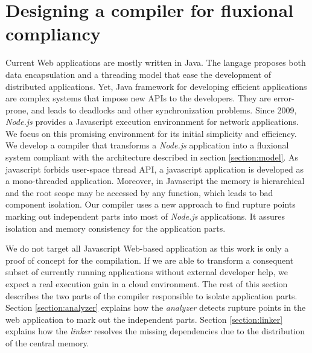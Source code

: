 \section{Designing a compiler for fluxional compliancy} \label{section:compiler}

Current Web applications are mostly written in Java. The langage proposes both data encapsulation and a threading model that ease the development of distributed applications.
Yet, Java framework for developing efficient applications are complex systems that impose new APIs\cite{Coward2003} to the developers.
They are error-prone, and leads to deadlocks and other synchronization problems.
Since 2009, \textit{Node.js}\cite{Dahl} provides a Javascript execution environnment for network applications.
We focus on this promising environment for its initial simplicity and efficiency.
We develop a compiler that transforms a \textit{Node.js} application into a fluxional system compliant with the architecture described in section \ref{section:model}.
As javascript forbids user-space thread API, a javascript application is developed as a mono-threaded application.
Moreover, in Javascript  the memory is hierarchical and the root scope may be accessed by any function, which leads to bad component isolation.
Our compiler uses a new approach to find rupture points marking out independent parts into most of \textit{Node.js} applications.
It assures isolation and memory consistency for the application parts.

We do not target all Javascript Web-based application as this work is only a proof of concept for the compilation.
If we are able to transform a consequent subset of currently running applications without external developer help, we expect a real execution gain in a cloud environment.
The rest of this section describes the two parts of the compiler responsible to isolate application parts.
Section \ref{section:analyzer} explains how the \textit{analyzer} detects rupture points in the web application to mark out the independent parts.
Section \ref{section:linker} explains how the \textit{linker} resolves the missing dependencies due to the distribution of the central memory.

